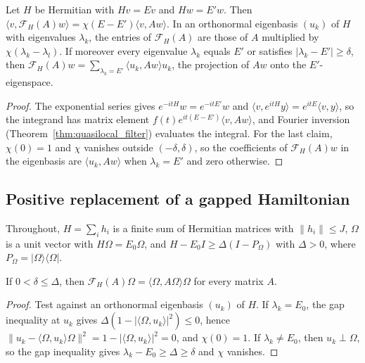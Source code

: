 \begin{theorem}
    \label{thm:filter_integral_multiplier}
    \leanok
    Let $H$ be Hermitian with $Hv=Ev$ and $Hw=E'w$. Then
    $\langle v,\mathcal F_H(A)w\rangle=\chi(E-E')\langle v,Aw\rangle$. In an
    orthonormal eigenbasis $(u_k)$ of $H$ with eigenvalues $\lambda_k$, the
    entries of $\mathcal F_H(A)$ are those of $A$ multiplied by
    $\chi(\lambda_k-\lambda_l)$. If moreover every eigenvalue $\lambda_k$
    equals $E'$ or satisfies $|\lambda_k-E'|\ge\delta$, then
    $\mathcal F_H(A)w=\sum_{\lambda_k=E'}\langle u_k,Aw\rangle u_k$, the
    projection of $Aw$ onto the $E'$-eigenspace.
\end{theorem}
\begin{proof}\leanok
    The exponential series gives $e^{-itH}w=e^{-itE'}w$ and
    $\langle v,e^{itH}y\rangle=e^{itE}\langle v,y\rangle$, so the integrand
    has matrix element $f(t)e^{it(E-E')}\langle v,Aw\rangle$, and Fourier
    inversion (Theorem~\ref{thm:quasilocal_filter}) evaluates the integral.
    For the last claim, $\chi(0)=1$ and $\chi$ vanishes outside
    $(-\delta,\delta)$, so the coefficients of $\mathcal F_H(A)w$ in the
    eigenbasis are $\langle u_k,Aw\rangle$ when $\lambda_k=E'$ and zero
    otherwise.
\end{proof}

\subsection{Positive replacement of a gapped Hamiltonian}
\label{sec:positive_replacement}

Throughout, $H=\sum_i h_i$ is a finite sum of Hermitian matrices with
$\|h_i\|\le J$, $\Omega$ is a unit vector with $H\Omega=E_0\Omega$, and
$H-E_0I\ge\Delta(I-P_\Omega)$ with $\Delta>0$, where
$P_\Omega=|\Omega\rangle\langle\Omega|$.

\begin{lemma}
    \label{lem:filter_below_gap}
    \leanok
    If $0<\delta\le\Delta$, then $\mathcal F_H(A)\Omega=\langle\Omega,A\Omega\rangle\Omega$
    for every matrix $A$.
\end{lemma}
\begin{proof}\leanok
    Test against an orthonormal eigenbasis $(u_k)$ of $H$. If
    $\lambda_k=E_0$, the gap inequality at $u_k$ gives
    $\Delta(1-|\langle\Omega,u_k\rangle|^2)\le0$, hence
    $\|u_k-\langle\Omega,u_k\rangle\Omega\|^2=1-|\langle\Omega,u_k\rangle|^2=0$,
    and $\chi(0)=1$. If $\lambda_k\ne E_0$, then $u_k\perp\Omega$, so the gap
    inequality gives $\lambda_k-E_0\ge\Delta\ge\delta$ and $\chi$ vanishes.
\end{proof}

